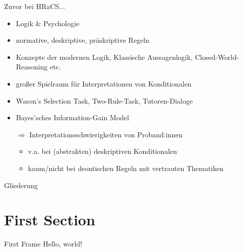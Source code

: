 
\begin{frame}{Zuvor bei HRaCS...}
    \begin{itemize}
        \item Logik \& Psychologie
        \item normative, deskriptive, präskriptive Regeln
        \pause
        
        \item Konzepte der modernen Logik, Klassische Aussagenlogik, Closed-World-Reasoning etc.
        \item großer Spielraum für Interpretationen von Konditionalen
        \pause

        \item Wason's Selection Task, Two-Rule-Task, Tutoren-Dialoge
        \item Bayes'sches Information-Gain Model
        \item[$\Rightarrow$] \alert{Interpretationsschwierigkeiten} von Proband:innen
        \begin{itemize}
            \item v.a. bei (abstrakten) deskriptiven Konditionalen
            \item kaum/nicht bei deontischen Regeln mit vertrauten Thematiken
        \end{itemize}
    \end{itemize}
\end{frame}

\begin{frame}{Gliederung}
    \tableofcontents
  \end{frame}

\section{First Section}

\begin{frame}{First Frame}
    Hello, world! \cite{stenningHumanReasoningCognitive2008}
\end{frame}
